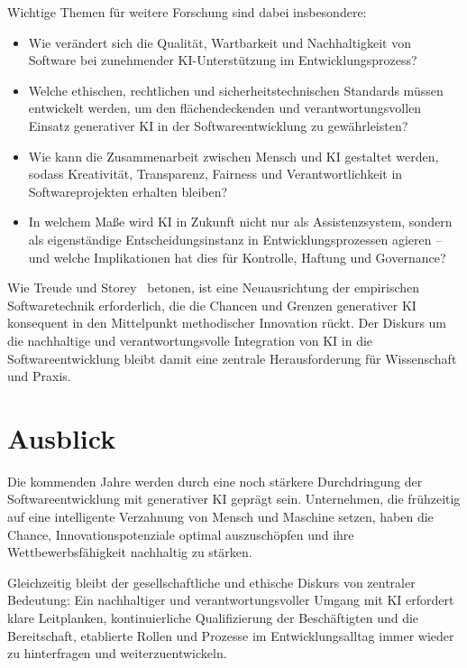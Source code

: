 Wichtige Themen für weitere Forschung sind dabei insbesondere:
\begin{itemize}
      \item Wie verändert sich die Qualität, Wartbarkeit und Nachhaltigkeit von Software
            bei zunehmender KI-Unterstützung im Entwicklungsprozess?
      \item Welche ethischen, rechtlichen und sicherheitstechnischen Standards müssen
            entwickelt werden, um den flächendeckenden und verantwortungsvollen Einsatz
            generativer KI in der Softwareentwicklung zu gewährleisten?
      \item Wie kann die Zusammenarbeit zwischen Mensch und KI gestaltet werden, sodass
            Kreativität, Transparenz, Fairness und Verantwortlichkeit in Softwareprojekten
            erhalten bleiben?
      \item In welchem Maße wird KI in Zukunft nicht nur als Assistenzsystem, sondern als
            eigenständige Entscheidungsinstanz in Entwicklungsprozessen agieren – und
            welche Implikationen hat dies für Kontrolle, Haftung und Governance?
\end{itemize}

Wie Treude und Storey~\cite{treude_generative_2025} betonen, ist eine
Neuausrichtung der empirischen Softwaretechnik erforderlich, die die Chancen
und Grenzen generativer KI konsequent in den Mittelpunkt methodischer
Innovation rückt. Der Diskurs um die nachhaltige und verantwortungsvolle
Integration von KI in die Softwareentwicklung bleibt damit eine zentrale
Herausforderung für Wissenschaft und Praxis.

\section{Ausblick}

Die kommenden Jahre werden durch eine noch stärkere Durchdringung der
Softwareentwicklung mit generativer KI geprägt sein. Unternehmen, die
frühzeitig auf eine intelligente Verzahnung von Mensch und Maschine setzen,
haben die Chance, Innovationspotenziale optimal auszuschöpfen und ihre
Wettbewerbsfähigkeit nachhaltig zu stärken.

Gleichzeitig bleibt der gesellschaftliche und ethische Diskurs von zentraler
Bedeutung: Ein nachhaltiger und verantwortungsvoller Umgang mit KI erfordert
klare Leitplanken, kontinuierliche Qualifizierung der Beschäftigten und die
Bereitschaft, etablierte Rollen und Prozesse im Entwicklungsalltag immer wieder
zu hinterfragen und weiterzuentwickeln.


